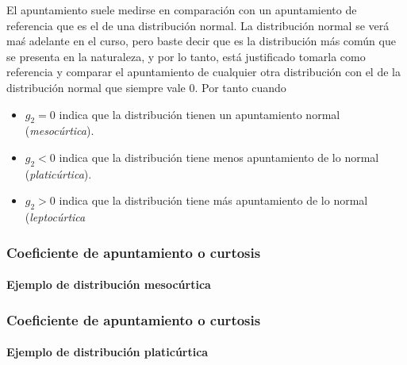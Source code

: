 \begin{frame}
{El apuntamiento suele medirse en comparación con un apuntamiento de referencia que es el de una distribución normal. La distribución normal
se verá maś adelante en el curso, pero baste decir que es la distribución más común que se presenta en la naturaleza, y por lo tanto, está
justificado tomarla como referencia y comparar el apuntamiento de cualquier otra distribución con el de la distribución normal que siempre
vale 0. Por tanto cuando
\begin{itemize}
\item $g_2=0$ indica que la distribución tienen un apuntamiento normal (\emph{mesocúrtica}).
\item $g_2<0$ indica que la distribución tiene menos apuntamiento de lo normal (\emph{platicúrtica}).
\item $g_2>0$ indica que la distribución tiene más apuntamiento de lo normal (\emph{leptocúrtica}
\end{itemize}
}
\end{frame}


\begin{frame}
\frametitle{Coeficiente de apuntamiento o curtosis}
\framesubtitle{Ejemplo de distribución mesocúrtica}
\begin{center}
\scalebox{0.8}{}
\end{center}
\end{frame}


\begin{frame}
\frametitle{Coeficiente de apuntamiento o curtosis}
\framesubtitle{Ejemplo de distribución platicúrtica}
\begin{center}
\scalebox{0.8}{}
\end{center}
\end{frame}


